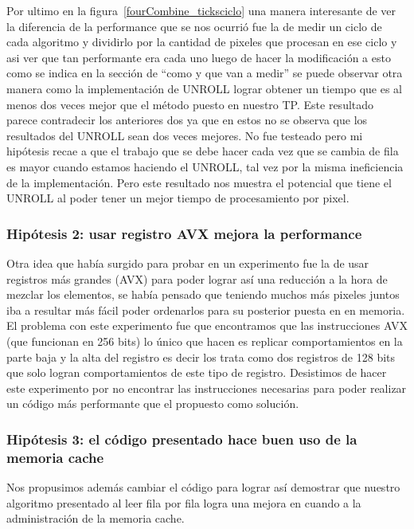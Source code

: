 Por ultimo en la figura~\ref{fourCombine_ticksciclo} una manera interesante de ver la diferencia de la performance que se nos ocurrió fue la de medir un ciclo de cada algoritmo y dividirlo por la cantidad de pixeles que procesan en ese ciclo y asi ver que tan performante era cada uno luego de hacer la modificación a esto como se indica en la sección de ``como y que van a medir'' se puede observar otra manera como la implementación de UNROLL lograr obtener un tiempo que es al menos dos veces mejor que el método puesto en nuestro TP. Este resultado parece contradecir los anteriores dos ya que en estos no se observa que los resultados del UNROLL sean dos veces mejores. No fue testeado pero mi hipótesis recae a que el trabajo que se debe hacer cada vez que se cambia de fila es mayor cuando estamos haciendo el UNROLL, tal vez por la misma ineficiencia de la implementación. Pero este resultado nos muestra el potencial que tiene el UNROLL al poder tener un mejor tiempo de procesamiento por pixel.


\subsubsection*{Hipótesis 2: usar registro AVX mejora la performance}
Otra idea que había surgido para probar en un experimento fue la de usar registros más grandes (AVX) para poder lograr así una reducción a la hora de mezclar los elementos, se había pensado que teniendo muchos más pixeles juntos iba a resultar más fácil poder ordenarlos para su posterior puesta en en memoria. El problema con este experimento fue que encontramos que las instrucciones AVX (que funcionan en 256 bits) lo único que hacen es replicar comportamientos en la parte baja y la alta del registro es decir los trata como dos registros de 128 bits que solo logran comportamientos de este tipo de registro. Desistimos de hacer este experimento por no encontrar las instrucciones necesarias para poder realizar un código más performante que el propuesto como solución.

\subsubsection*{Hipótesis 3: el código presentado hace buen uso de la memoria cache}
Nos propusimos además cambiar el código para lograr así demostrar que nuestro algoritmo presentado al leer fila por fila logra una mejora en cuando a la administración de la memoria cache. 

